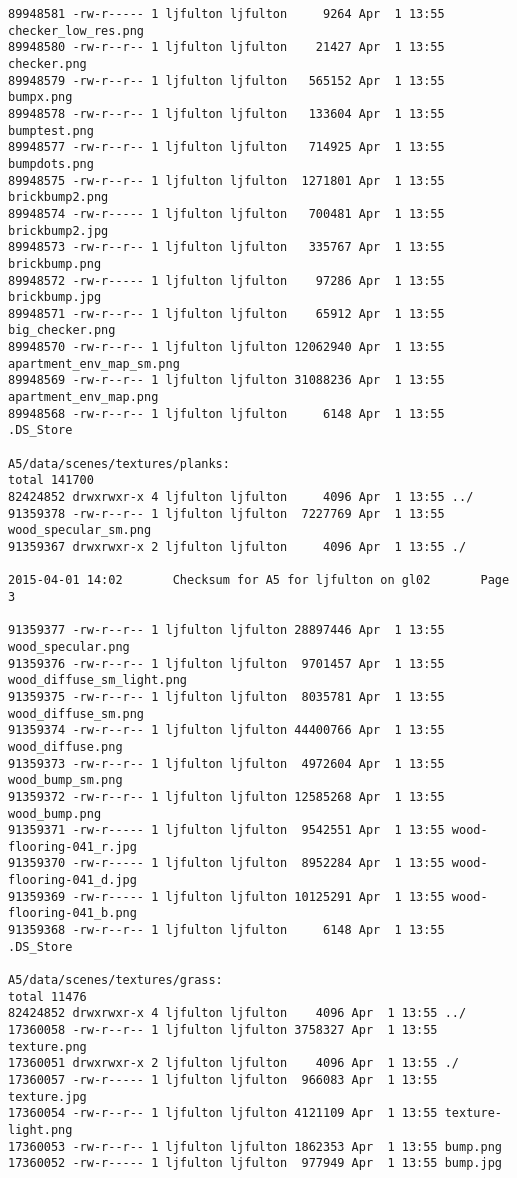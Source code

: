 \documentclass[12pt]{article}
\begin{document}
\begin{verbatim}
89948581 -rw-r----- 1 ljfulton ljfulton     9264 Apr  1 13:55 checker_low_res.png
89948580 -rw-r--r-- 1 ljfulton ljfulton    21427 Apr  1 13:55 checker.png
89948579 -rw-r--r-- 1 ljfulton ljfulton   565152 Apr  1 13:55 bumpx.png
89948578 -rw-r--r-- 1 ljfulton ljfulton   133604 Apr  1 13:55 bumptest.png
89948577 -rw-r--r-- 1 ljfulton ljfulton   714925 Apr  1 13:55 bumpdots.png
89948575 -rw-r--r-- 1 ljfulton ljfulton  1271801 Apr  1 13:55 brickbump2.png
89948574 -rw-r----- 1 ljfulton ljfulton   700481 Apr  1 13:55 brickbump2.jpg
89948573 -rw-r--r-- 1 ljfulton ljfulton   335767 Apr  1 13:55 brickbump.png
89948572 -rw-r----- 1 ljfulton ljfulton    97286 Apr  1 13:55 brickbump.jpg
89948571 -rw-r--r-- 1 ljfulton ljfulton    65912 Apr  1 13:55 big_checker.png
89948570 -rw-r--r-- 1 ljfulton ljfulton 12062940 Apr  1 13:55 apartment_env_map_sm.png
89948569 -rw-r--r-- 1 ljfulton ljfulton 31088236 Apr  1 13:55 apartment_env_map.png
89948568 -rw-r--r-- 1 ljfulton ljfulton     6148 Apr  1 13:55 .DS_Store

A5/data/scenes/textures/planks:
total 141700
82424852 drwxrwxr-x 4 ljfulton ljfulton     4096 Apr  1 13:55 ../
91359378 -rw-r--r-- 1 ljfulton ljfulton  7227769 Apr  1 13:55 wood_specular_sm.png
91359367 drwxrwxr-x 2 ljfulton ljfulton     4096 Apr  1 13:55 ./

2015-04-01 14:02       Checksum for A5 for ljfulton on gl02       Page 3

91359377 -rw-r--r-- 1 ljfulton ljfulton 28897446 Apr  1 13:55 wood_specular.png
91359376 -rw-r--r-- 1 ljfulton ljfulton  9701457 Apr  1 13:55 wood_diffuse_sm_light.png
91359375 -rw-r--r-- 1 ljfulton ljfulton  8035781 Apr  1 13:55 wood_diffuse_sm.png
91359374 -rw-r--r-- 1 ljfulton ljfulton 44400766 Apr  1 13:55 wood_diffuse.png
91359373 -rw-r--r-- 1 ljfulton ljfulton  4972604 Apr  1 13:55 wood_bump_sm.png
91359372 -rw-r--r-- 1 ljfulton ljfulton 12585268 Apr  1 13:55 wood_bump.png
91359371 -rw-r----- 1 ljfulton ljfulton  9542551 Apr  1 13:55 wood-flooring-041_r.jpg
91359370 -rw-r----- 1 ljfulton ljfulton  8952284 Apr  1 13:55 wood-flooring-041_d.jpg
91359369 -rw-r----- 1 ljfulton ljfulton 10125291 Apr  1 13:55 wood-flooring-041_b.png
91359368 -rw-r--r-- 1 ljfulton ljfulton     6148 Apr  1 13:55 .DS_Store

A5/data/scenes/textures/grass:
total 11476
82424852 drwxrwxr-x 4 ljfulton ljfulton    4096 Apr  1 13:55 ../
17360058 -rw-r--r-- 1 ljfulton ljfulton 3758327 Apr  1 13:55 texture.png
17360051 drwxrwxr-x 2 ljfulton ljfulton    4096 Apr  1 13:55 ./
17360057 -rw-r----- 1 ljfulton ljfulton  966083 Apr  1 13:55 texture.jpg
17360054 -rw-r--r-- 1 ljfulton ljfulton 4121109 Apr  1 13:55 texture-light.png
17360053 -rw-r--r-- 1 ljfulton ljfulton 1862353 Apr  1 13:55 bump.png
17360052 -rw-r----- 1 ljfulton ljfulton  977949 Apr  1 13:55 bump.jpg


\end{verbatim}
\end{document}
